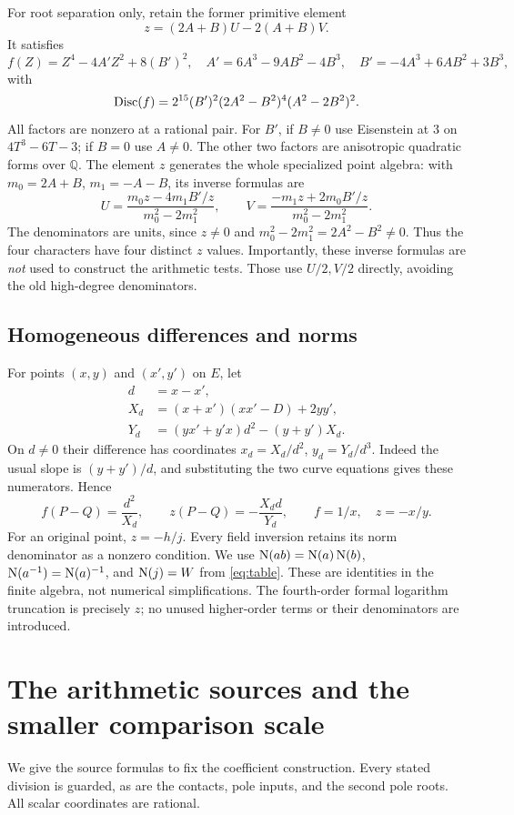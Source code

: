 \documentclass[11pt,a4paper]{article}
\theoremstyle{remark}\newtheorem{remark}[theorem]{Remark}
\newcommand{\Q}{\mathbb Q}\newcommand{\Z}{\mathbb Z}\newcommand{\C}{\mathbb C}
\begin{document}
For root separation only, retain the former primitive element
\begin{equation}\label{eq:primitive}
 z=(2A+B)U-2(A+B)V.
\end{equation}
It satisfies
\[
 f(Z)=Z^4-4A'Z^2+8(B')^2,
\quad A'=6A^3-9AB^2-4B^3,
\quad B'=-4A^3+6AB^2+3B^3,
\]
with
\begin{equation}\label{eq:discriminant}
 \operatorname{Disc}(f)=2^{15}(B')^2(2A^2-B^2)^4(A^2-2B^2)^2.
\end{equation}
All factors are nonzero at a rational pair. For $B'$, if $B\ne0$
use Eisenstein at $3$ on $4T^3-6T-3$; if $B=0$ use $A\ne0$.
The other two factors are anisotropic quadratic forms over $\Q$.
The element $z$ generates the whole specialized point algebra:
with $m_0=2A+B$, $m_1=-A-B$, its inverse formulas are
\[
 U=\frac{m_0z-4m_1B'/z}{m_0^2-2m_1^2},\qquad
 V=\frac{-m_1z+2m_0B'/z}{m_0^2-2m_1^2}.
\]
The denominators are units, since $z\ne0$ and
$m_0^2-2m_1^2=2A^2-B^2\ne0$. Thus the four characters have
four distinct $z$ values. Importantly, these inverse formulas are
\emph{not} used to construct the arithmetic tests. Those use $U/2,V/2$
directly, avoiding the old high-degree denominators.

\subsection{Homogeneous differences and norms}
For points $(x,y)$ and $(x',y')$ on $E$, let
\begin{equation}\label{eq:difference}
\begin{split}
 d&=x-x',\\
 X_d&=(x+x')(xx'-D)+2yy',\\
 Y_d&=(yx'+y'x)d^2-(y+y')X_d.
\end{split}
\end{equation}
On $d\ne0$ their difference has coordinates
$x_d=X_d/d^2$, $y_d=Y_d/d^3$. Indeed the usual slope is
$(y+y')/d$, and substituting the two curve equations gives these
numerators. Hence
\[
 f(P-Q)=\frac{d^2}{X_d},\qquad
 z(P-Q)=-\frac{X_dd}{Y_d},\qquad f=1/x,\quad z=-x/y.
\]
For an original point, $z=-h/j$. Every field inversion retains its
norm denominator as a nonzero condition. We use
$\operatorname{N}(ab)=\operatorname{N}(a)\operatorname{N}(b)$, $\operatorname{N}(a^{-1})=\operatorname{N}(a)^{-1}$, and
$\operatorname{N}(j)=W$ from \eqref{eq:table}. These are identities in the finite
algebra, not numerical simplifications. The fourth-order formal
logarithm truncation is precisely $z$; no unused higher-order terms
or their denominators are introduced.

\section{The arithmetic sources and the smaller comparison scale}
We give the source formulas to fix the coefficient construction. Every
stated division is guarded, as are the contacts, pole inputs, and the
second pole roots. All scalar coordinates are rational.
\end{document}
